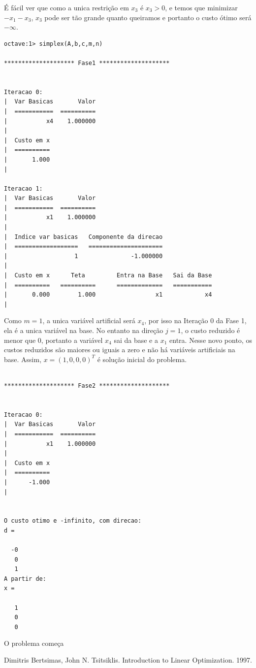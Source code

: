 \documentclass[12pt]{article}
\begin{document}
	É fácil ver que como a unica restrição em $x_3$ é $x_3 > 0$, e temos que minimizar $-x_1 - x_3$, $x_3$ pode ser tão grande quanto queiramos e portanto o custo ótimo será $-\infty$.
	\begin{lstlisting}[style=term]
octave:1> simplex(A,b,c,m,n)

******************** Fase1 ********************


Iteracao 0:
|  Var Basicas       Valor
|  ===========  ==========
|           x4    1.000000
|  
|  Custo em x
|  ==========
|       1.000
|  

Iteracao 1:
|  Var Basicas       Valor
|  ===========  ==========
|           x1    1.000000
|  
|  Indice var basicas   Componente da direcao
|  ==================   =====================
|                   1               -1.000000
|  
|  Custo em x      Teta         Entra na Base   Sai da Base
|  ==========   ==========      =============   ===========
|       0.000        1.000                 x1            x4
|  

	\end{lstlisting}
	Como $m = 1$, a unica variável artificial será $x_4$, por isso na Iteração 0 da Fase 1, ela é a unica variável na base. No entanto na direção $j = 1$, o custo reduzido é menor que 0, portanto a variável $x_4$ sai da base e a $x_1$ entra. Nesse novo ponto, os custos reduzidos são maiores ou iguais a zero e não há variáveis artificiais na base. Assim, $x = (1, 0, 0, 0)^T$ é solução inicial do problema.
	
	\lstset {firstnumber=29}
	\begin{lstlisting}[style=term]

******************** Fase2 ********************


Iteracao 0:
|  Var Basicas       Valor
|  ===========  ==========
|           x1    1.000000
|  
|  Custo em x
|  ==========
|      -1.000
|  


O custo otimo e -infinito, com direcao:
d =

  -0
   0
   1
A partir de:
x = 

   1
   0
   0

	\end{lstlisting}
	O problema começa 

    

\newpage
\begin{thebibliography}{9}
 Dimitris Bertsimas, John N. Tsitsiklis. Introduction to Linear Optimization. 1997.
\end{thebibliography}
\end{document}
